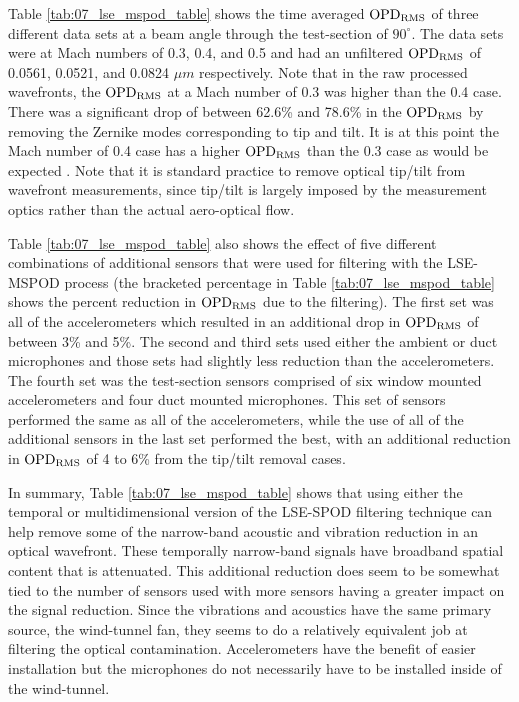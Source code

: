 Table \ref{tab:07_lse_mspod_table} shows the time averaged $\operatorname{OPD_{RMS}}$ of three different data sets at a beam angle through the test-section of $90^\circ$.
The data sets were at Mach numbers of 0.3, 0.4, and 0.5 and had an unfiltered $\operatorname{OPD_{RMS}}$ of 0.0561, 0.0521, and 0.0824 $\mu m$ respectively.
Note that in the raw processed wavefronts, the $\operatorname{OPD_{RMS}}$ at a Mach number of 0.3 was higher than the 0.4 case.
There was a significant drop of between 62.6\% and 78.6\% in the $\operatorname{OPD_{RMS}}$ by removing the Zernike modes corresponding to tip and tilt.
It is at this point the Mach number of 0.4 case has a higher $\operatorname{OPD_{RMS}}$ than the 0.3 case as would be expected \cite{Gordeyev-2014-jcJndkHM}.
Note that it is standard practice to remove optical tip/tilt from wavefront measurements, since tip/tilt is largely imposed by the measurement optics rather than the actual aero-optical flow.

Table \ref{tab:07_lse_mspod_table} also shows the effect of five different combinations of additional sensors that were used for filtering with the LSE-MSPOD process (the bracketed percentage in Table \ref{tab:07_lse_mspod_table} shows the percent reduction in $\operatorname{OPD_{RMS}}$ due to the filtering).
The first set was all of the accelerometers which resulted in an additional drop in $\operatorname{OPD_{RMS}}$ of between 3\% and 5\%.
The second and third sets used either the ambient or duct microphones and those sets had slightly less reduction than the accelerometers.
The fourth set was the test-section sensors comprised of six window mounted accelerometers and four duct mounted microphones.
This set of sensors performed the same as all of the accelerometers, while the use of all of the additional sensors in the last set performed the best, with an additional reduction in $\operatorname{OPD_{RMS}}$ of 4 to 6\% from the tip/tilt removal cases.


In summary, Table \ref{tab:07_lse_mspod_table} shows that using either the temporal or multidimensional version of the LSE-SPOD filtering technique can help remove some of the narrow-band acoustic and vibration reduction in an optical wavefront.
These temporally narrow-band signals have broadband spatial content that is attenuated.
This additional reduction does seem to be somewhat tied to the number of sensors used with more sensors having a greater impact on the signal reduction.
Since the vibrations and acoustics have the same primary source, the wind-tunnel fan, they seems to do a relatively equivalent job at filtering the optical contamination.
Accelerometers have the benefit of easier installation but the microphones do not necessarily have to be installed inside of the wind-tunnel.
